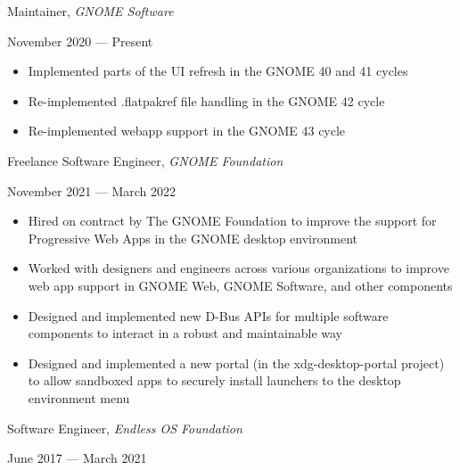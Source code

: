 \documentclass[11pt]{article}
\begin{document}
\begin{minipage}[t]{0.65\textwidth}
\flushleft
Maintainer, \textit{GNOME Software}\\
\end{minipage}
\begin{minipage}[t]{0.30\textwidth}
\flushright
November 2020 --- Present\\
\end{minipage}

\begin{itemize}
  \item Implemented parts of the UI refresh in the GNOME 40 and 41 cycles
  \item Re-implemented .flatpakref file handling in the GNOME 42 cycle
  \item Re-implemented webapp support in the GNOME 43 cycle
\end{itemize}

\begin{minipage}[t]{0.65\textwidth}
\flushleft
Freelance Software Engineer, \textit{GNOME Foundation}\\
\end{minipage}
\begin{minipage}[t]{0.30\textwidth}
\flushright
November 2021 --- March 2022\\
\end{minipage}

\begin{itemize}
  \item Hired on contract by The GNOME Foundation to improve the support for Progressive Web Apps in the GNOME desktop environment
  \item Worked with designers and engineers across various organizations to improve web app support in GNOME Web, GNOME Software, and other components
  \item Designed and implemented new D-Bus APIs for multiple software components to interact in a robust and maintainable way
  \item Designed and implemented a new portal (in the xdg-desktop-portal project) to allow sandboxed apps to securely install launchers to the desktop environment menu
\end{itemize}

\begin{minipage}[t]{0.65\textwidth}
\flushleft
Software Engineer, \textit{Endless OS Foundation}\\
\end{minipage}
\begin{minipage}[t]{0.30\textwidth}
\flushright
June 2017 --- March 2021\\
\end{minipage}
\end{document}
